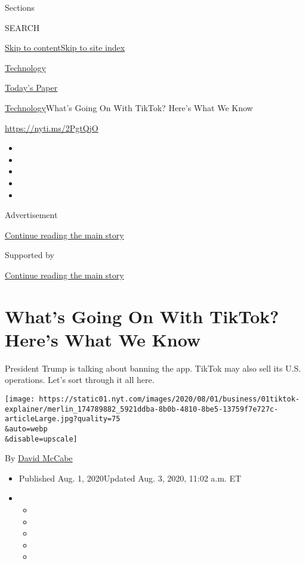 Sections

SEARCH

\protect\hyperlink{site-content}{Skip to
content}\protect\hyperlink{site-index}{Skip to site index}

\href{https://www.nytimes.com/section/technology}{Technology}

\href{https://myaccount.nytimes.com/auth/login?response_type=cookie\&client_id=vi}{}

\href{https://www.nytimes.com/section/todayspaper}{Today's Paper}

\href{/section/technology}{Technology}\textbar{}What's Going On With
TikTok? Here's What We Know

\url{https://nyti.ms/2PgtQjO}

\begin{itemize}
\item
\item
\item
\item
\item
\end{itemize}

Advertisement

\protect\hyperlink{after-top}{Continue reading the main story}

Supported by

\protect\hyperlink{after-sponsor}{Continue reading the main story}

\hypertarget{whats-going-on-with-tiktok-heres-what-we-know}{%
\section{What's Going On With TikTok? Here's What We
Know}\label{whats-going-on-with-tiktok-heres-what-we-know}}

President Trump is talking about banning the app. TikTok may also sell
its U.S. operations. Let's sort through it all here.

\texttt{[image: https://static01.nyt.com/images/2020/08/01/business/01tiktok-explainer/merlin\_174789882\_5921ddba-8b0b-4810-8be5-13759f7e727c-articleLarge.jpg?quality=75\\\&auto=webp\\\&disable=upscale]}

By \href{https://www.nytimes.com/by/david-mccabe}{David McCabe}

\begin{itemize}
\item
  Published Aug. 1, 2020Updated Aug. 3, 2020, 11:02 a.m. ET
\item
  \begin{itemize}
  \item
  \item
  \item
  \item
  \item
  \end{itemize}
\end{itemize}

